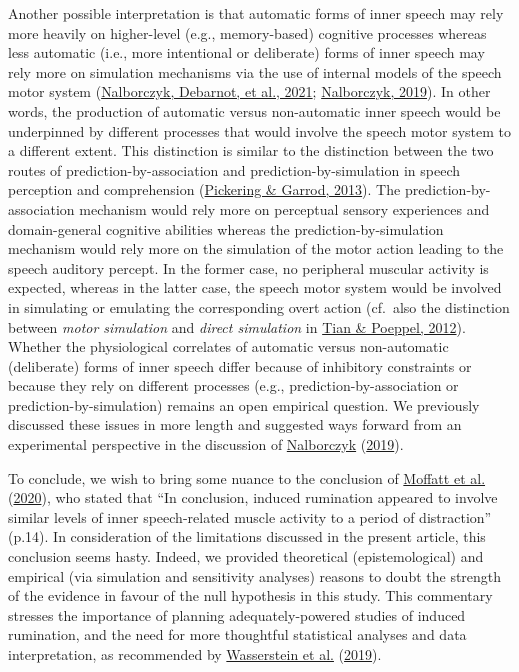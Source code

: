 \documentclass[
  english,
  man, donotrepeattitle,floatsintext]{apa6}
\begin{document}
Another possible interpretation is that automatic forms of inner speech may rely more heavily on higher-level (e.g., memory-based) cognitive processes whereas less automatic (i.e., more intentional or deliberate) forms of inner speech may rely more on simulation mechanisms via the use of internal models of the speech motor system (\protect\hyperlink{ref-nalborczyk_role_2021}{Nalborczyk, Debarnot, et al., 2021}; \protect\hyperlink{ref-nalborczyk_understanding_2019}{Nalborczyk, 2019}). In other words, the production of automatic versus non-automatic inner speech would be underpinned by different processes that would involve the speech motor system to a different extent. This distinction is similar to the distinction between the two routes of prediction-by-association and prediction-by-simulation in speech perception and comprehension (\protect\hyperlink{ref-pickering_integrated_2013}{Pickering \& Garrod, 2013}). The prediction-by-association mechanism would rely more on perceptual sensory experiences and domain-general cognitive abilities whereas the prediction-by-simulation mechanism would rely more on the simulation of the motor action leading to the speech auditory percept. In the former case, no peripheral muscular activity is expected, whereas in the latter case, the speech motor system would be involved in simulating or emulating the corresponding overt action (cf.~also the distinction between \emph{motor simulation} and \emph{direct simulation} in \protect\hyperlink{ref-tian_mental_2012}{Tian \& Poeppel, 2012}). Whether the physiological correlates of automatic versus non-automatic (deliberate) forms of inner speech differ because of inhibitory constraints or because they rely on different processes (e.g., prediction-by-association or prediction-by-simulation) remains an open empirical question. We previously discussed these issues in more length and suggested ways forward from an experimental perspective in the discussion of \protect\hyperlink{ref-nalborczyk_understanding_2019}{Nalborczyk} (\protect\hyperlink{ref-nalborczyk_understanding_2019}{2019}).

To conclude, we wish to bring some nuance to the conclusion of \protect\hyperlink{ref-moffatt_inner_2020}{Moffatt et al.} (\protect\hyperlink{ref-moffatt_inner_2020}{2020}), who stated that ``In conclusion, induced rumination appeared to involve similar levels of inner speech-related muscle activity to a period of distraction'' (p.14). In consideration of the limitations discussed in the present article, this conclusion seems hasty. Indeed, we provided theoretical (epistemological) and empirical (via simulation and sensitivity analyses) reasons to doubt the strength of the evidence in favour of the null hypothesis in this study. This commentary stresses the importance of planning adequately-powered studies of induced rumination, and the need for more thoughtful statistical analyses and data interpretation, as recommended by \protect\hyperlink{ref-wasserstein_moving_2019}{Wasserstein et al.} (\protect\hyperlink{ref-wasserstein_moving_2019}{2019}).
\end{document}
